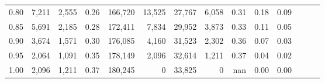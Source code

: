 \begin{tabular}{rrrrrrrrrrrrrr}
0.80 &   7,211 &  2,555 &  0.26 &  166,720 &   13,525 &  27,767 &   6,058 &  0.31 &  0.18 &      0.09 \\
0.85 &   5,691 &  2,185 &  0.28 &  172,411 &    7,834 &  29,952 &   3,873 &  0.33 &  0.11 &      0.05 \\
0.90 &   3,674 &  1,571 &  0.30 &  176,085 &    4,160 &  31,523 &   2,302 &  0.36 &  0.07 &      0.03 \\
0.95 &   2,064 &  1,091 &  0.35 &  178,149 &    2,096 &  32,614 &   1,211 &  0.37 &  0.04 &      0.02 \\
1.00 &   2,096 &  1,211 &  0.37 &  180,245 &        0 &  33,825 &       0 &   nan &  0.00 &      0.00 \\
\bottomrule
\end{tabular}
